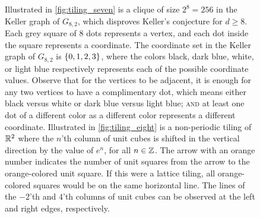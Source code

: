 \begin{figure}[t!]
    \caption{Illustrated in \cref{fig:tiling_seven} is a clique of size $2^8=256$ in the Keller graph of $G_{8,2}$, which disproves Keller's conjecture for $d\geq8$. Each grey square of $8$ dots represents a vertex, and each dot inside the square represents a coordinate. The coordinate set in the Keller graph of $G_{8,2}$ is $\{0,1,2,3\}$, where the colors black, dark blue, white, or light blue respectively represents each of the possible coordinate values. Observe that for the vertices to be adjacent, it is enough for any two vertices to have a complimentary dot, which means either black versus white or dark blue versus light blue; \textsc{and} at least one dot of a different color as a different color represents a different coordinate. Illustrated in \cref{fig:tiling_eight} is a non-periodic tiling of $\mathbb{R}^2$ where the $n$'th column of unit cubes is shifted in the vertical direction by the value of $e^n$, for all $n\in\mathbb{Z}$. The arrow with an orange number indicates the number of unit squares from the arrow to the orange-colored unit square. If this were a lattice tiling, all orange-colored squares would be on the same horizontal line. The lines of the $-2$'th and $4$'th columns of unit cubes can be observed at the left and right edges, respectively.}
    \label{fig:tilings_seven_eight}
\end{figure}
